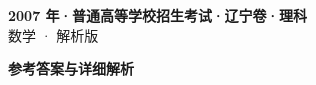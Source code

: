 \documentclass[zihao=-4, a4paper]{ctexart}
\begin{document}
\begin{center}
  {\Large\bfseries 2007 年·普通高等学校招生考试·辽宁卷·理科}\\[4pt]
  {\large 数学 · 解析版}
\end{center}
\medskip
{}

\clearpage
{}
\begin{center}{\Large\bfseries 参考答案与详细解析}\end{center}
\medskip

\end{document}
